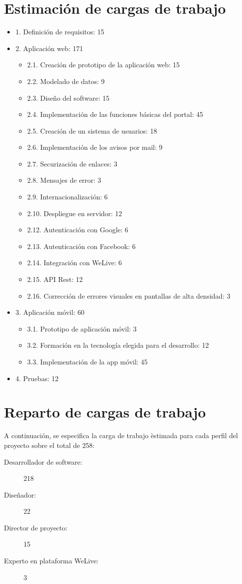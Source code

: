 \documentclass{DeustoFDP}
\begin{document}
\section{Estimación de cargas de trabajo}
\begin{itemize}
    \item 1. Definición de requisitos: 15
    \item 2. Aplicación web: 171
    \begin{itemize}
        \item 2.1. Creación de prototipo de la aplicación web: 15
        \item 2.2. Modelado de datos: 9
        \item 2.3. Diseño del software: 15
        \item 2.4. Implementación de las funciones básicas del portal: 45
        \item 2.5. Creación de un sistema de usuarios: 18
        \item 2.6. Implementación de los avisos por mail: 9
        \item 2.7. Securización de enlaces: 3
        \item 2.8. Mensajes de error: 3
        \item 2.9. Internacionalización: 6
        \item 2.10. Despliegue en servidor: 12
        \item 2.12. Autenticación con Google: 6
        \item 2.13. Autenticación con Facebook: 6
        \item 2.14. Integración con WeLive: 6
        \item 2.15. API Rest: 12
        \item 2.16. Corrección de errores visuales en pantallas de alta densidad: 3
    \end{itemize}
    \item 3. Aplicación móvil: 60
    \begin{itemize}
        \item 3.1. Prototipo de aplicación móvil: 3
        \item 3.2. Formación en la tecnología elegida para el desarrollo: 12
        \item 3.3. Implementación de la app móvil: 45
    \end{itemize}
    \item 4. Pruebas: 12
\end{itemize}
\section{Reparto de cargas de trabajo}
A continuación, se especifica la carga de trabajo èstimada para cada perfil del proyecto sobre el total de 258:
\begin{description}
    \item[Desarrollador de software:] 218
    \item[Diseñador:] 22
    \item[Director de proyecto:] 15
    \item[Experto en plataforma WeLive:] 3
\end{description}
\end{document}
